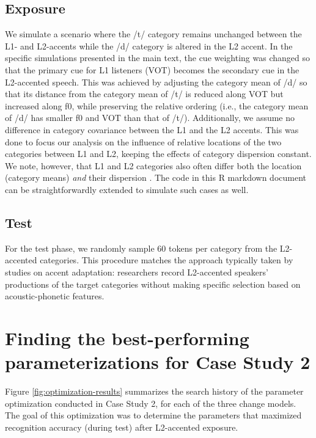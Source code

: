 \documentclass[
  11pt,
  man,floatsintext]{apa6}
\begin{document}
\subsection{Exposure}\label{exposure-1}

We simulate a scenario where the /t/ category remains unchanged between the L1- and L2-accents while the /d/ category is altered in the L2 accent. In the specific simulations presented in the main text, the cue weighting was changed so that the primary cue for L1 listeners (VOT) becomes the secondary cue in the L2-accented speech. This was achieved by adjusting the category mean of /d/ so that its distance from the category mean of /t/ is reduced along VOT but increased along f0, while preserving the relative ordering (i.e., the category mean of /d/ has smaller f0 and VOT than that of /t/). Additionally, we assume no difference in category covariance between the L1 and the L2 accents. This was done to focus our analysis on the influence of relative locations of the two categories between L1 and L2, keeping the effects of category dispersion constant. We note, however, that L1 and L2 categories also often differ both the location (category means) \emph{and} their dispersion \autocites[category variance-covariance, e.g.,][]{schertz2015,xie-jaeger2020}. The code in this R markdown document can be straightforwardly extended to simulate such cases as well.

\subsection{Test}\label{test-1}

For the test phase, we randomly sample 60 tokens per category from the L2-accented categories. This procedure matches the approach typically taken by studies on accent adaptation: researchers record L2-accented speakers' productions of the target categories without making specific selection based on acoustic-phonetic features.

\section{Finding the best-performing parameterizations for Case Study 2}\label{sec:SI-grid-search}

Figure \ref{fig:optimization-results} summarizes the search history of the parameter optimization conducted in Case Study 2, for each of the three change models. The goal of this optimization was to determine the parameters that maximized recognition accuracy (during test) after L2-accented exposure.
\end{document}
